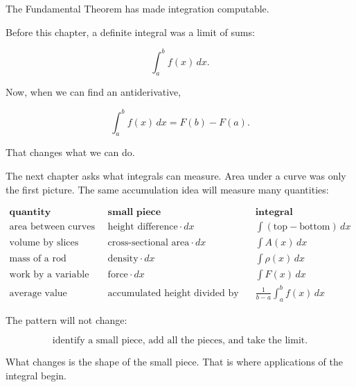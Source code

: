 The Fundamental Theorem has made integration computable.

Before this chapter, a definite integral was a limit of sums:

\[
\int_a^b f(x)\,dx.
\]

Now, when we can find an antiderivative,

\[
\int_a^b f(x)\,dx=F(b)-F(a).
\]

That changes what we can do.

The next chapter asks what integrals can measure.  Area under a curve was only the
first picture.  The same accumulation idea will measure many quantities:

\[
\begin{array}{c|c|c}
\textbf{quantity} & \textbf{small piece} & \textbf{integral} \\ \hline
\text{area between curves} & \text{height difference}\cdot dx
& \displaystyle\int (\text{top}-\text{bottom})\,dx \\[8pt]
\text{volume by slices} & \text{cross-sectional area}\cdot dx
& \displaystyle\int A(x)\,dx \\[8pt]
\text{mass of a rod} & \text{density}\cdot dx
& \displaystyle\int \rho(x)\,dx \\[8pt]
\text{work by a variable force} & \text{force}\cdot dx
& \displaystyle\int F(x)\,dx \\[8pt]
\text{average value} & \text{accumulated height divided by length}
& \displaystyle \frac1{b-a}\int_a^b f(x)\,dx
\end{array}
\]

The pattern will not change:

\[
\boxed{
\text{identify a small piece, add all the pieces, and take the limit.}
}
\]

What changes is the shape of the small piece.  That is where applications of the
integral begin.
